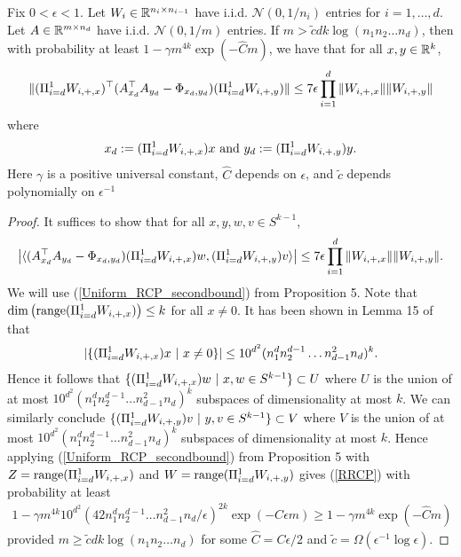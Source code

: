 \documentclass{article}
\begin{document}
\begin{prop}
Fix $0 < \epsilon < 1$. Let $W_{i} \in \mathbb{R}^{n_i \times n_{i-1}}$ have i.i.d. $\mathcal{N}(0,1/n_i)$ entries for $i = 1,\dots,d$. Let $A \in \mathbb{R}^{m \times n_d}$ have i.i.d. $\mathcal{N}(0,1/m)$ entries. If $m > \tilde{c}dk \log (n_1n_2\dots n_d)$, then with probability at least $1 - \gamma m^{4k} \exp(-\hat{C} m)$, we have that for all $x,y \in \mathbb{R}^k$, \begin{align*}
%
\|(\PiWdix)^\top( A_{x_d}^\top A_{y_d} - \Phi_{x_d,y_d} )(\PiWdiy)\| \leq 7\epsilon \prod_{i=1}^d\|W_{i,+,x}\|\|W_{i,+,y}\|
\end{align*} where \begin{align*}
x_d : = (\Pi_{i=d}^1 W_{i,+,x})x\ \text{and}\ y_d : = (\Pi_{i=d}^1 W_{i,+,y})y.
\end{align*} Here $\gamma$ is a positive universal constant, $\hat{C}$ depends on $\epsilon$, and $\tilde{c}$ depends polynomially on $\epsilon^{-1}$
\end{prop}

\begin{proof}
It suffices to show that for all $x,y,w,v \in S^{k-1}$, \begin{align}
\left|\langle (A_{x_d}^\top A_{y_d}-\Phi_{x_d,y_d})(\Pi_{i=d}^1 W_{i,+,x})w,(\Pi_{i=d}^1 W_{i,+,y})v \rangle\right|\leq 7\epsilon \prod_{i=1}^d\|W_{i,+,x}\|\|W_{i,+,y}\|. \label{RRCP}
\end{align} We will use (\ref{Uniform_RCP_secondbound}) from Proposition 5. Note that $\operatorname{dim} \left(\text{range}(\Pi_{i=d}^1 W_{i,+,x})\right) \leq k$ for all $x \neq 0$. It has been shown in Lemma 15 of \cite{Hand2017} that \begin{align*}
|\{ (\Pi_{i=d}^1 W_{i,+,x})x\ |\ x \neq 0\}| \leq 10^{d^2}(n_1^d n_2^{d-1}\dots n_{d-1}^2n_d)^k.
\end{align*} Hence it follows that $\{(\Pi_{i=d}^1 W_{i,+,x}) w\ |\ x,w \in S^{k-1}\} \subset U$ where $U$ is the union of at most $10^{d^2}(n_1^dn_2^{d-1}\dots n_{d-1}^2n_d)^k$ subspaces of dimensionality at most $k$. We can similarly conclude $\{(\Pi_{i=d}^1 W_{i,+,y}) v\ |\ y,v \in S^{k-1}\} \subset V$ where $V$ is the union of at most $10^{d^2}(n_1^dn_2^{d-1}\dots n_{d-1}^2n_d)^k$ subspaces of dimensionality at most $k$. Hence applying (\ref{Uniform_RCP_secondbound}) from Proposition 5 with $Z = \text{range}(\Pi_{i=d}^1 W_{i,+,x})$ and $W = \text{range}(\Pi_{i=d}^1 W_{i,+,y})$ gives (\ref{RRCP}) with probability at least \begin{align}
1- \gamma m^{4k} 10^{d^2} (42 n_1^dn_2^{d-1}\dots n_{d-1}^2n_d/\epsilon)^{2k} \exp(-C \epsilon m) \geq 1- \gamma m^{4k} \exp(-\hat{C} m)
\end{align} provided $m \geq \tilde{c}dk \log (n_1 n_2 \dots n_d)$ for some $\hat{C} = C\epsilon/2$ and $\tilde{c} = \Omega (\epsilon^{-1}\log \epsilon)$.
\end{proof}
\end{document}
